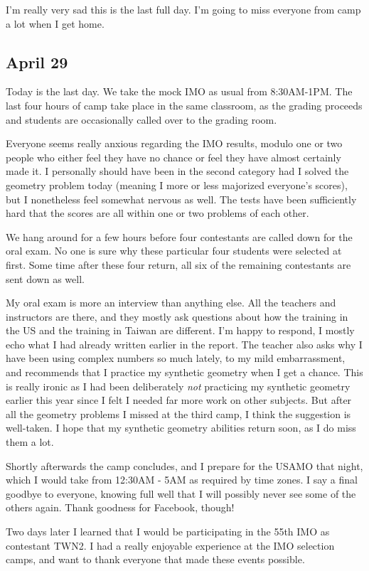 \documentclass[11pt]{scrreprt}
\begin{document}
I'm really very sad this is the last full day. I'm going to miss everyone from camp a lot when I get home.

\subsection{April 29}
Today is the last day. We take the mock IMO as usual from 8:30AM-1PM.
The last four hours of camp take place in the same classroom,
as the grading proceeds and students are occasionally called over to the grading room.

Everyone seems really anxious regarding the IMO results,
modulo one or two people who either feel they have no chance or feel they have almost certainly made it.
I personally should have been in the second category had I solved the geometry
problem today (meaning I more or less majorized everyone's scores),
but I nonetheless feel somewhat nervous as well.
The tests have been sufficiently hard that the scores are all within one or two problems of each other.

We hang around for a few hours before four contestants are called down for the oral exam.
No one is sure why these particular four students were selected at first.
Some time after these four return, all six of the remaining contestants are sent down as well.

My oral exam is more an interview than anything else.
All the teachers and instructors are there,
and they mostly ask questions about how the training in the US and the training in Taiwan are different.
I'm happy to respond, I mostly echo what I had already written earlier in the report.
The teacher also asks why I have been using complex numbers so much lately, to my mild embarrassment,
and recommends that I practice my synthetic geometry when I get a chance.
This is really ironic as I had been deliberately \emph{not} practicing my
synthetic geometry earlier this year since I felt I needed far more work on other subjects.
But after all the geometry problems I missed at the third camp, I think the suggestion is well-taken.
I hope that my synthetic geometry abilities return soon, as I do miss them a lot.

Shortly afterwards the camp concludes, and I prepare for the USAMO that night,
which I would take from 12:30AM - 5AM as required by time zones.
I say a final goodbye to everyone, knowing full well that I will possibly never see some of the others again.
Thank goodness for Facebook, though!

Two days later I learned that I would be participating in the 55th IMO as contestant TWN2.
I had a really enjoyable experience at the IMO selection camps,
and want to thank everyone that made these events possible.
\end{document}
